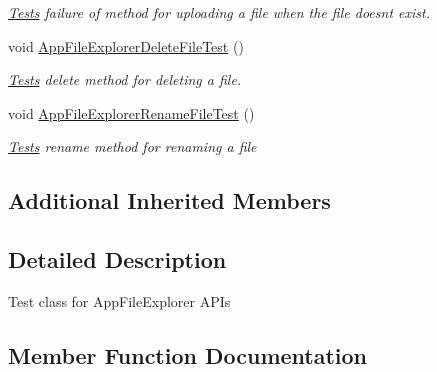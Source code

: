 \begin{DoxyCompactItemize}
\begin{DoxyCompactList}\small\item\em \hyperlink{namespace_microsoft_1_1_tools_1_1_windows_device_portal_1_1_tests}{Tests} failure of method for uploading a file when the file doesn\textquotesingle{}t exist. \end{DoxyCompactList}\item 
void \hyperlink{class_microsoft_1_1_tools_1_1_windows_device_portal_1_1_tests_1_1_app_file_explorer_tests_aba2b8a4a8007bd90a73123fe940ee867}{App\+File\+Explorer\+Delete\+File\+Test} ()
\begin{DoxyCompactList}\small\item\em \hyperlink{namespace_microsoft_1_1_tools_1_1_windows_device_portal_1_1_tests}{Tests} delete method for deleting a file. \end{DoxyCompactList}\item 
void \hyperlink{class_microsoft_1_1_tools_1_1_windows_device_portal_1_1_tests_1_1_app_file_explorer_tests_a487356b140853c23d6e5318196c352ca}{App\+File\+Explorer\+Rename\+File\+Test} ()
\begin{DoxyCompactList}\small\item\em \hyperlink{namespace_microsoft_1_1_tools_1_1_windows_device_portal_1_1_tests}{Tests} rename method for renaming a file \end{DoxyCompactList}\end{DoxyCompactItemize}
\subsection*{Additional Inherited Members}


\subsection{Detailed Description}
Test class for App\+File\+Explorer A\+P\+Is 



\subsection{Member Function Documentation}
